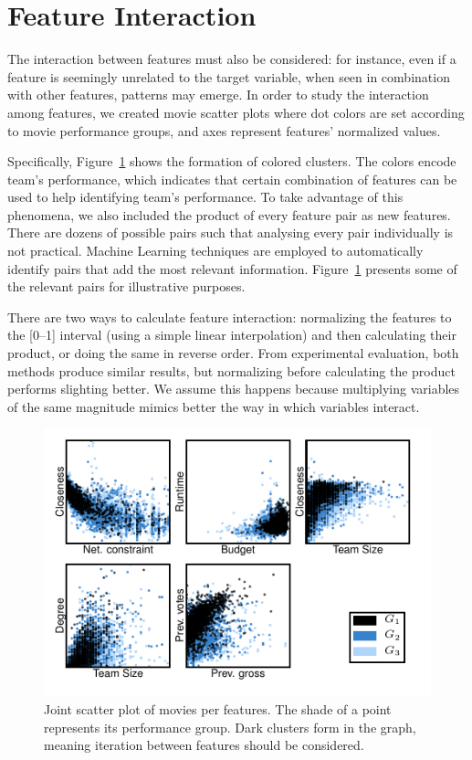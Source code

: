 \section{Feature Interaction}
\label{sec:feature_interac}
The interaction between features must also be considered: for instance, even if
a feature is seemingly unrelated to the target variable, when seen in
combination with other features, patterns may emerge. In order to study the
interaction among features, we created movie scatter plots where dot colors are
set according to movie performance groups, and axes represent features'
normalized values.

Specifically, Figure~\ref{fig:interaction} shows the formation of colored
clusters. The colors encode team's performance, which indicates that certain
combination of features can be used to help identifying team's performance. To
take advantage of this phenomena, we also included the product of every feature
pair as new features. There are dozens of possible pairs such that analysing
every pair individually is not practical. Machine Learning techniques are
employed to automatically identify pairs that add the most relevant
information. Figure~\ref{fig:interaction} presents some of the relevant pairs
for illustrative purposes.

There are two ways to calculate feature interaction: normalizing the features
to the [0--1] interval (using a simple linear interpolation) and then
calculating their product, or doing the same in reverse order. From
experimental evaluation, both methods produce similar results, but normalizing
before calculating the product performs slighting better. We assume this
happens because multiplying variables of the same magnitude mimics better the
way in which variables interact.

\begin{figure}[t]\begin{center}
\includegraphics[width=\columnwidth]{../../images/feature_interaction.pdf}
\caption{\label{fig:interaction}Joint scatter plot of movies per features. The
shade of a point represents its performance group. Dark clusters form 
in the graph, meaning iteration between features should be considered.}
\end{center}\end{figure}
